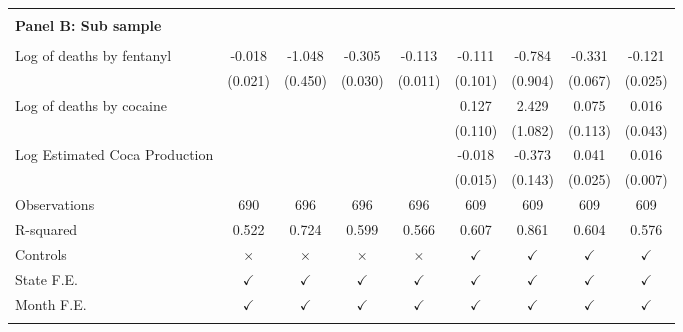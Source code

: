 \begin{tabular}{lcccccccc}
 \hline  & & & & &  &  &  &  \\ \textbf{Panel B: Sub sample} \\ & & & & & & & & \\
Log of deaths by fentanyl&      -0.018         &      -1.048\sym{*}  &      -0.305\sym{***}&      -0.113\sym{***}&      -0.111         &      -0.784         &      -0.331\sym{***}&      -0.121\sym{***}\\
                    &     (0.021)         &     (0.450)         &     (0.030)         &     (0.011)         &     (0.101)         &     (0.904)         &     (0.067)         &     (0.025)         \\
\addlinespace
Log of deaths by cocaine&                     &                     &                     &                     &       0.127         &       2.429\sym{*}  &       0.075         &       0.016         \\
                    &                     &                     &                     &                     &     (0.110)         &     (1.082)         &     (0.113)         &     (0.043)         \\
\addlinespace
Log Estimated Coca Production&                     &                     &                     &                     &      -0.018         &      -0.373\sym{**} &       0.041         &       0.016\sym{**} \\
                    &                     &                     &                     &                     &     (0.015)         &     (0.143)         &     (0.025)         &     (0.007)         \\
\arrayrulecolor{black!10}\midrule
Observations        &         690         &         696         &         696         &         696         &         609         &         609         &         609         &         609         \\
R-squared           &       0.522         &       0.724         &       0.599         &       0.566         &       0.607         &       0.861         &       0.604         &       0.576         \\
Controls            &    $\times$         &    $\times$         &    $\times$         &    $\times$         &$\checkmark$         &$\checkmark$         &$\checkmark$         &$\checkmark$         \\
State F.E.          &$\checkmark$         &$\checkmark$         &$\checkmark$         &$\checkmark$         &$\checkmark$         &$\checkmark$         &$\checkmark$         &$\checkmark$         \\
Month F.E.          &$\checkmark$         &$\checkmark$         &$\checkmark$         &$\checkmark$         &$\checkmark$         &$\checkmark$         &$\checkmark$         &$\checkmark$         \\
\arrayrulecolor{black}\bottomrule
\end{tabular}
